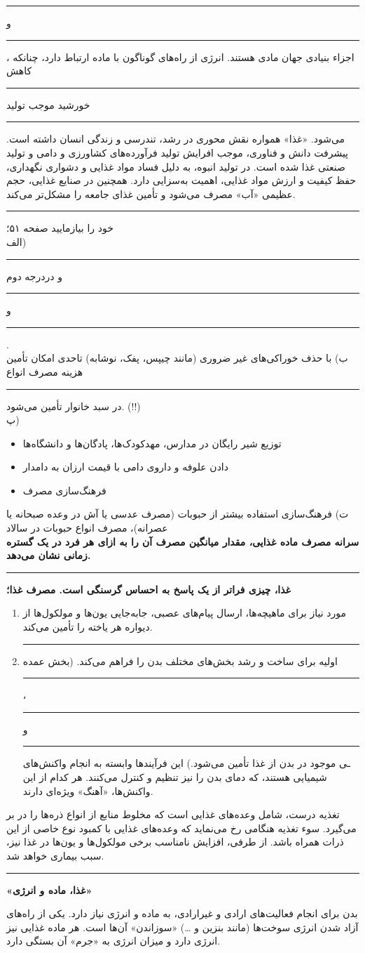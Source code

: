 \documentclass[a4paper,12pt]{article}
\newenvironment{en}
	{\begin{enumerate}\setlength\itemsep{-0.2em}}
	{\end{enumerate}}
\newenvironment{iit}
	{\begin{itemize}\setlength\itemsep{-0.5em}}
	{\end{itemize}}
\newcommand{\ff}{\rule{1cm}{0.15mm}\;}
\newcommand{\fs}{\rule{1cm}{0.15mm}}
\newcommand{\lin}{\vspace{4pt}\hrule\vspace{4pt}}
\begin{document}
	\ff و \ff ،‌ اجزاء بنیادی جهان مادی هستند. انرژی از راه‌های گوناگون با ماده ارتباط دارد، چنانکه کاهش \ff خورشید موجب تولید \ff می‌شود. «غذا» همواره نقش محوری در رشد، تندرسی و زندگی انسان داشته است. پیشرفت دانش و فناوری، موجب افرایش تولید فرآورده‌های کشاورزی و دامی و تولید صنعتی غذا شده است. در تولید انبوه، به دلیل فساد مواد غذایی و دشواری نگهداری، حفظ کیفیت و ارزش مواد غذایی، اهمیت به‌سزایی دارد. همچنین در صنایع غذایی، حجم عظیمی «آب» مصرف می‌شود و تأمین غذای جامعه را مشکل‌تر می‌کند.
	\lin
	\vspace{8pt}
خود را بیازمایید صفحه ۵۱؛\\
الف) \ff و دردرجه دوم 
\ff 
 و  
\ff.
\\
ب) با حذف خوراکی‌های غیر ضروری (مانند چیپس، پفک، نوشابه) تاحدی امکان تأمین هزینه مصرف انواع \ff در سبد خانوار تأمین می‌شود. (!!)\\
پ)
	\begin{iit}
		\item توزیع شیر رایگان در مدارس، مهدکودک‌ها، پادگان‌ها و دانشگاه‌ها
	 
	 	\item دادن علوفه و داروی دامی با قیمت ارزان به دامدار 
	 
	 	\item فرهنگ‌سازی مصرف
	\end{iit}
	ت) فرهنگ‌سازی استفاده بیشتر از حبوبات (مصرف عدسی یا آش در وعده صبحانه یا عصرانه)، مصرف انواع حبوبات در سالاد\\
	\textbf {سرانه مصرف ماده غذایی، مقدار میانگین مصرف آن را به ازای هر فرد در یک گستره زمانی نشان می‌دهد.}
	\vspace{4pt}
	\hrule
	\begin{center}
		\textbf{غذا، چیزی فراتر از یک پاسخ به احساس گرسنگی است. مصرف غذا؛}
	\end{center}
	\begin{en}
		\item مورد نیاز برای ماهیچه‌ها، ارسال پیام‌های عصبی، جابه‌جایی یون‌ها و مولکول‌ها از دیواره هر یاخته را تأمین می‌کند.
		\item \ff اولیه برای ساخت و رشد بخش‌های مختلف بدن را فراهم می‌کند. (بخش عمده \ff ، \ff  و \fs ـی موجود در بدن از غذا تأمین می‌شود.) این فرآیند‌ها وابسته به انجام واکنش‌های شیمیایی هستند، که دمای بدن را نیز تنظیم و کنترل می‌کنند. هر کدام از این واکنش‌ها، «آهنگ» ویژه‌ای دارند.
	\end{en}

تغذیه درست، شامل وعده‌های غذایی است که مخلوط منابع از انواع ذره‌ها را در بر می‌گیرد. سوء تغذیه هنگامی رخ می‌نماید که وعده‌های غذایی با کمبود نوع خاصی از این ذرات همراه باشد. از طرفی، افزایش نامناسب برخی مولکول‌ها و یون‌ها در غذا نیز، سبب بیماری خواهد شد.
	\vspace{4pt}
	\hrule
	\begin{center}
		\textbf{«غذا، ماده و انرژی»}
	\end{center}
بدن برای انجام فعالیت‌های ارادی و غیرارادی، به ماده و انرژی نیاز دارد. یکی از راه‌های آزاد شدن انرژی سوخت‌ها (مانند بنزین و …) «سوزاندن» آن‌ها است. هر ماده غذایی نیز انرژی دارد و میزان انرژی به «جرم» آن بستگی دارد.
	\newpage
\end{document}
